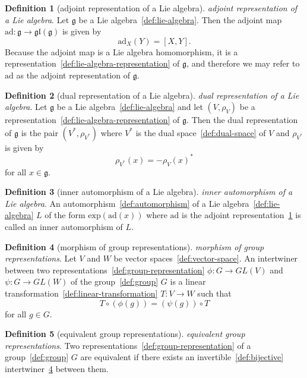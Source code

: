 \documentclass[12pt,a4paper]{article}
\theoremstyle{definition}
\newtheorem{definition}{Definition}
\begin{document}
\begin{definition}[adjoint representation of a Lie algebra]\label{def:adjoint-representation-of-a-lie-algebra}
\emph{adjoint representation of a Lie algebra}. Let $\mathfrak g$ be a Lie algebra~\ref{def:lie-algebra}. Then the adjoint map $\text{ad}:\mathfrak g \to \mathfrak{gl}(\mathfrak g)$ is given by $$\text{ad}_X(Y) = [X,Y].$$ Because the adjoint map is a Lie algebra homomorphism, it is a representation~\ref{def:lie-algebra-representation} of $\mathfrak g$, and therefore we may refer to $\text{ad}$ as the adjoint representation of $\mathfrak g$.
\end{definition}

\begin{definition}[dual representation of a Lie algebra]\label{def:dual-representation-of-a-lie-algebra}
\emph{dual representation of a Lie algebra}. Let $\mathfrak g$ be a Lie algebra~\ref{def:lie-algebra} and let $(V,\rho_V)$ be a representation~\ref{def:lie-algebra-representation} of $\mathfrak g$. Then the dual representation of $\mathfrak g$ is the pair $(V^*,\rho_{V^*})$ where $V^*$ is the dual space~\ref{def:dual-space} of $V$ and $\rho_{V^*}$ is given by $$\rho_{V^*}(x) = -\rho_V(x)^
*$$ for all $x \in \mathfrak g$.
\end{definition}

\begin{definition}[inner automorphism of a Lie algebra]\label{def:inner-automorphism-of-a-lie-algebra}
\emph{inner automorphism of a Lie algebra}. An automorphism~\ref{def:automorphism} of a Lie algebra~\ref{def:lie-algebra} $L$ of the form $\text{exp}(\text{ad} (x))$ where $\text{ad}$ is the adjoint representation~\ref{def:adjoint-representation-of-a-lie-algebra} is called an inner automorphism of $L$.
\end{definition}

\begin{definition}[morphism of group representations]\label{def:morphism-of-group-representations}
\emph{morphism of group representations}. Let $V$ and $W$ be vector spaces~\ref{def:vector-space}. An intertwiner between two representations~\ref{def:group-representation} $\phi:G\to GL(V)$ and $\psi:G\to GL(W)$ of the group~\ref{def:group} $G$ is a linear transformation~\ref{def:linear-transformation} $T:V\to W$ such that $$T\circ(\phi(g)) = (\psi(g))\circ T$$ for all $g \in G$.
\end{definition}

\begin{definition}[equivalent group representations]\label{def:equivalent-group-representations}
\emph{equivalent group representations}. Two representations~\ref{def:group-representation} of a group~\ref{def:group} $G$ are equivalent if there exists an invertible~\ref{def:bijective} intertwiner~\ref{def:morphism-of-group-representations} between them.
\end{definition}
\end{document}

